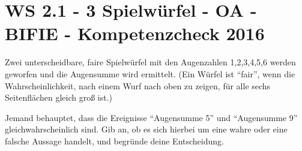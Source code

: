 \section{WS 2.1 - 3 Spielwürfel - OA - BIFIE - Kompetenzcheck 2016}

\begin{beispiel}[WS 2.1]{1} %
				Zwei unterscheidbare, faire Spielwürfel mit den Augenzahlen 1,2,3,4,5,6 werden geworfen und die Augensumme wird ermittelt. (Ein Würfel ist "`fair"', wenn die Wahrscheinlichkeit, nach einem Wurf nach oben zu zeigen, für alle sechs Seitenflächen gleich groß ist.)

Jemand behauptet, dass die Ereignisse "`Augensumme 5"' und "`Augensumme 9"' gleichwahrscheinlich sind. Gib an, ob es sich hierbei um eine wahre oder eine falsche Aussage handelt, und begründe deine Entscheidung.\\

\end{beispiel}